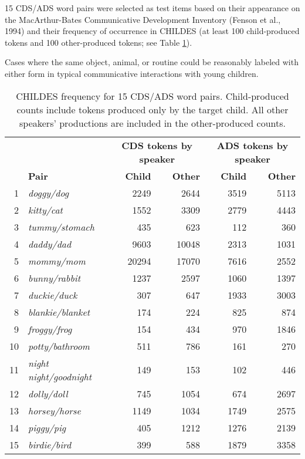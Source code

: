 \documentclass[10pt, letterpaper]{article}
\begin{document}
15 CDS/ADS word pairs were selected as test items based on their
appearance on the MacArthur-Bates Communicative Development Inventory
(Fenson et al., 1994) and their frequency of occurrence in CHILDES (at
least 100 child-produced tokens and 100 other-produced tokens; see Table
\ref{tab:tab1}).

Cases where the same object, animal, or routine could be reasonably
labeled with either form in typical communicative interactions with
young children.

\begin{table}[ht]
\centering
\fontsize{6}{8}\selectfont
\begin{tabular}{r>{}lrrrr}
  \toprule
\multicolumn{2}{c}{\textbf{ }} & \multicolumn{2}{c}{\textbf{CDS tokens by speaker}} & \multicolumn{2}{c}{\textbf{ADS tokens by speaker}} \\
\cmidrule(l{3pt}r{3pt}){3-4} \cmidrule(l{3pt}r{3pt}){5-6}
\textbf{} & \textbf{Pair} & \textbf{Child} & \textbf{Other} & \textbf{Child} & \textbf{Other }\\ 
  \midrule
1 & \em{doggy/dog} & 2249 & 2644 & 3519 & 5113 \\ 
  2 & \em{kitty/cat} & 1552 & 3309 & 2779 & 4443 \\ 
  3 & \em{tummy/stomach} & 435 & 623 & 112 & 360 \\ 
  4 & \em{daddy/dad} & 9603 & 10048 & 2313 & 1031 \\ 
  5 & \em{mommy/mom} & 20294 & 17070 & 7616 & 2552 \\ 
  6 & \em{bunny/rabbit} & 1237 & 2597 & 1060 & 1397 \\ 
  7 & \em{duckie/duck} & 307 & 647 & 1933 & 3003 \\ 
  8 & \em{blankie/blanket} & 174 & 224 & 825 & 874 \\ 
  9 & \em{froggy/frog} & 154 & 434 & 970 & 1846 \\ 
  10 & \em{potty/bathroom} & 511 & 786 & 161 & 270 \\ 
  11 & \em{night night/goodnight} & 149 & 153 & 102 & 446 \\ 
  12 & \em{dolly/doll} & 745 & 1054 & 674 & 2697 \\ 
  13 & \em{horsey/horse} & 1149 & 1034 & 1749 & 2575 \\ 
  14 & \em{piggy/pig} & 405 & 1212 & 1276 & 2139 \\ 
  15 & \em{birdie/bird} & 399 & 588 & 1879 & 3358 \\ 
   \bottomrule
\end{tabular}
\caption{CHILDES frequency for 15 CDS/ADS word pairs. Child-produced counts 
                             include tokens produced only by the target child. All other 
                             speakers' productions are included in the other-produced counts.} 
\label{tab:tab1}
\end{table}
\end{document}
